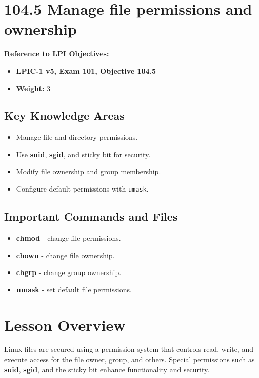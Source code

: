 \documentclass[a4paper]{report}
\begin{document}
\section*{104.5 Manage file permissions and ownership}

\textbf{Reference to LPI Objectives:}
\begin{itemize}
    \item \textbf{LPIC-1 v5, Exam 101, Objective 104.5}
    \item \textbf{Weight:} 3
\end{itemize}

\subsection*{Key Knowledge Areas}
\begin{itemize}
    \item Manage file and directory permissions.
    \item Use \textbf{suid}, \textbf{sgid}, and sticky bit for security.
    \item Modify file ownership and group membership.
    \item Configure default permissions with \texttt{umask}.
\end{itemize}

\subsection*{Important Commands and Files}
\begin{itemize}
    \item \textbf{chmod} \text{-}- change file permissions.
    \item \textbf{chown} \text{-}- change file ownership.
    \item \textbf{chgrp} \text{-}- change group ownership.
    \item \textbf{umask} \text{-}- set default file permissions.
\end{itemize}

\section*{Lesson Overview}

Linux files are secured using a permission system that controls read, write, and execute access for the file owner, group, and others. Special permissions such as \textbf{suid}, \textbf{sgid}, and the sticky bit enhance functionality and security.
\end{document}

